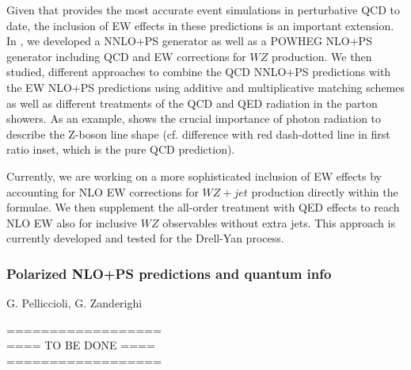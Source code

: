 \documentclass{FBR_Bericht_2025}
\begin{document}
\begin{refsection}
Given that \minnlo{} provides the most accurate event simulations in 
perturbative QCD to date, the inclusion of EW effects in these predictions
is an important extension. In \citere{}, we developed a \minnlo{} NNLO+PS generator 
as well as a POWHEG NLO+PS  generator including QCD and EW corrections 
for $WZ$ production. We then studied, different approaches to combine the
QCD NNLO+PS predictions with the EW NLO+PS predictions using additive 
and multiplicative matching schemes as well as different treatments of the 
QCD and QED radiation in the parton showers.
As an example,  shows the crucial importance of photon radiation
to describe the Z-boson line shape (cf. difference with 
red dash-dotted line in first ratio inset, which is the pure QCD prediction).

Currently, we are working on a more sophisticated inclusion of EW effects 
by accounting for NLO EW corrections for $WZ+jet$ production
directly within the \minnlo{} formulae. We then supplement the all-order treatment 
with QED effects to reach NLO EW also for inclusive $WZ$ observables without
extra jets. This approach is currently developed and tested for the Drell-Yan process.


\subsubsection{Polarized NLO+PS predictions and quantum info}
\begin{Namen}
G. Pelliccioli, G. Zanderighi
\end{Namen}
%
{\color{red} ==================\\ ====\; TO BE DONE\; ====\\ ==================}
%
\printbibliography[heading=subbibliography]
\end{refsection}
\end{document}
